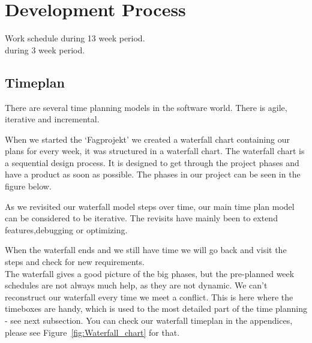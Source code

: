 \chapter{Development Process}
Work schedule during 13 week period.\\
       during 3 week period.
       \section{Timeplan}%

       There are several time planning models in the software world. There is agile, iterative and incremental.

       When we started the `Fagprojekt' we created a waterfall chart containing our plans for every week, it was structured in a waterfall chart. The waterfall chart is a sequential design process.
       It is designed to get through the project phases and have a product as soon as
       possible. The phases in our project can be seen in the figure below.

       As we revisited our waterfall model steps over time, our main
       time plan model can be considered to be iterative. The revisits have mainly
       been to extend features,debugging or optimizing.

       When the waterfall ends and we still have time
       we will go back and visit the steps and check for new requirements.
       \\The waterfall gives
       a good picture of the big phases, but the pre-planned week schedules are
       not always much help, as they are not dynamic. We can't reconstruct our waterfall every
       time we meet a conflict. This is here where the timeboxes are handy, which is used
       to the most detailed part of the time planning - see next subsection.
       You can check our waterfall timeplan in the appendices, please
       see Figure~\ref{fig:Waterfall_chart} for that.

